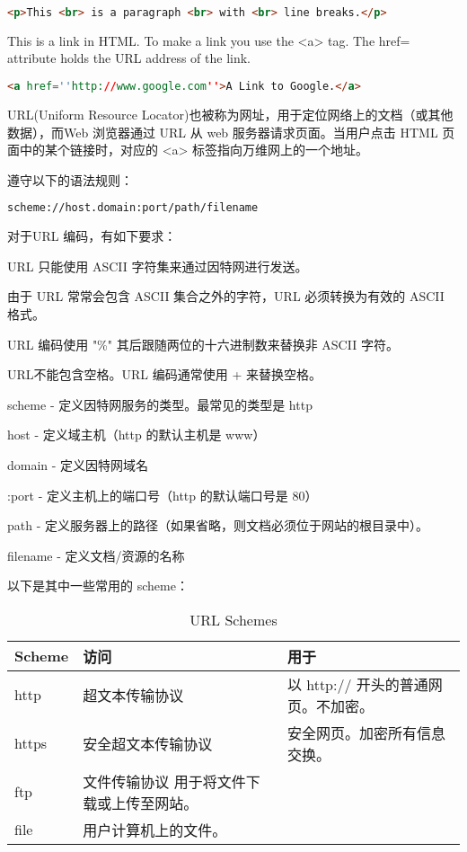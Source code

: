 \begin{lstlisting}[language=HTML]
	<p>This <br> is a paragraph <br> with <br> line breaks.</p>
\end{lstlisting}

This is a link in HTML. To make a link you use the <a> tag. The href= attribute holds the URL address of the link.

\begin{lstlisting}[language=HTML]
	<a href=''http://www.google.com''>A Link to Google.</a>
\end{lstlisting}

URL(Uniform Resource Locator)也被称为网址，用于定位网络上的文档（或其他数据），而Web 浏览器通过 URL 从 web 服务器请求页面。当用户点击 HTML 页面中的某个链接时，对应的 <a> 标签指向万维网上的一个地址。

遵守以下的语法规则：

\begin{lstlisting}[language=HTML]
  scheme://host.domain:port/path/filename
\end{lstlisting}

对于URL 编码，有如下要求：

\begin{compactitem}
\item URL 只能使用 ASCII 字符集来通过因特网进行发送。
\item 由于 URL 常常会包含 ASCII 集合之外的字符，URL 必须转换为有效的 ASCII 格式。
\item URL 编码使用 "\%" 其后跟随两位的十六进制数来替换非 ASCII 字符。
\item URL不能包含空格。URL 编码通常使用 + 来替换空格。
\end{compactitem}


\begin{compactitem}
\item scheme - 定义因特网服务的类型。最常见的类型是 http
\item host - 定义域主机（http 的默认主机是 www）
\item domain - 定义因特网域名
\item :port - 定义主机上的端口号（http 的默认端口号是 80）
\item path - 定义服务器上的路径（如果省略，则文档必须位于网站的根目录中）。
\item filename - 定义文档/资源的名称
\end{compactitem}


以下是其中一些常用的 scheme：
\begin{table}
\centering
\caption{URL Schemes}
\begin{tabular}{|l|l|l|}
\hline
Scheme		&访问	&用于		\\
\hline
http			&超文本传输协议	&以 http:// 开头的普通网页。不加密。\\
\hline
https		&安全超文本传输协议	&安全网页。加密所有信息交换。\\
\hline
ftp			&文件传输协议	用于将文件下载或上传至网站。\\
\hline
file	 		&用户计算机上的文件。\\
\hline
\end{tabular}
\end{table}

